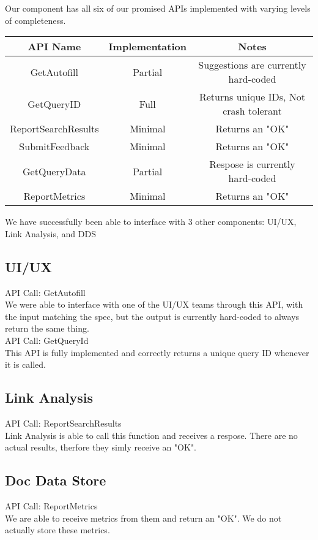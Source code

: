 Our component has all six of our promised APIs implemented with varying levels of completeness.

\begin{center}
    \begin{tabular}{ |c|c|c| } 
     \hline
     API Name & Implementation & Notes \\
     \hline \hline
     GetAutofill & Partial & Suggestions are currently hard-coded \\
     GetQueryID & Full & Returns unique IDs, Not crash tolerant \\
     ReportSearchResults & Minimal & Returns an "OK" \\
     SubmitFeedback & Minimal & Returns an "OK" \\
     GetQueryData & Partial & Respose is currently hard-coded \\
     ReportMetrics & Minimal & Returns an "OK" \\
     \hline
    \end{tabular}
\end{center}

We have successfully been able to interface with 3 other components: UI/UX, Link Analysis, and DDS

\subsection*{UI/UX}
API Call: GetAutofill
\\We were able to interface with one of the UI/UX teams through this API, with the input matching the spec, but the output is currently hard-coded to always return the same thing.
\smallskip
\\API Call: GetQueryId
\\This API is fully implemented and correctly returns a unique query ID whenever it is called.

\subsection*{Link Analysis}
API Call: ReportSearchResults
\\Link Analysis is able to call this function and receives a respose. There are no actual results, therfore they simly receive an "OK".

\subsection*{Doc Data Store}
API Call: ReportMetrics
\\We are able to receive metrics from them and return an "OK". We do not actually store these metrics.

